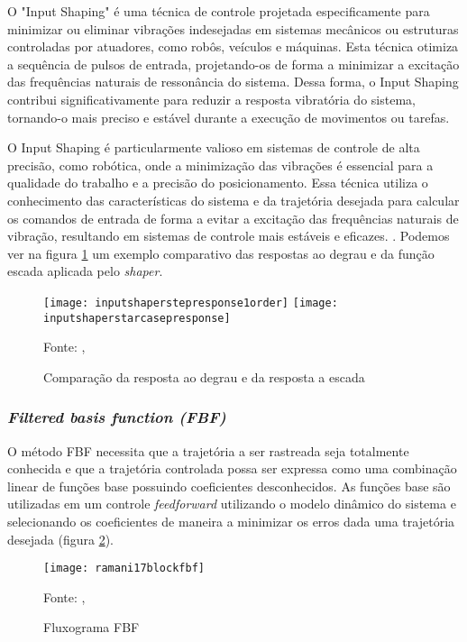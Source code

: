 O "Input Shaping" é uma técnica de controle projetada especificamente para minimizar ou eliminar vibrações indesejadas em sistemas mecânicos ou estruturas controladas por atuadores, como robôs, veículos e máquinas. Esta técnica otimiza a sequência de pulsos de entrada, projetando-os de forma a minimizar a excitação das frequências naturais de ressonância do sistema. Dessa forma, o Input Shaping contribui significativamente para reduzir a resposta vibratória do sistema, tornando-o mais preciso e estável durante a execução de movimentos ou tarefas.

O Input Shaping é particularmente valioso em sistemas de controle de alta precisão, como robótica, onde a minimização das vibrações é essencial para a qualidade do trabalho e a precisão do posicionamento. Essa técnica utiliza o conhecimento das características do sistema e da trajetória desejada para calcular os comandos de entrada de forma a evitar a excitação das frequências naturais de vibração, resultando em sistemas de controle mais estáveis e eficazes.
\cite{singhose97}.
Podemos
ver na figura \ref{fig:degr_vs_esc} um exemplo comparativo
das respostas ao degrau e da função escada aplicada pelo \textit{shaper}.

\begin{figure}[H]
    \centering
    \caption{Comparação da resposta ao degrau e da resposta a escada}
    \texttt{[image: inputshaperstepresponse1order]}
    \texttt{[image: inputshaperstarcasepresponse]}

    {\footnotesize Fonte: \citeauthor{singhose97}, \citeyear{singhose97}}
    \label{fig:degr_vs_esc}
\end{figure}

\subsubsection{\textit{Filtered basis function (FBF)}}
O método FBF necessita que a trajetória a ser rastreada seja totalmente
conhecida e que a trajetória controlada possa ser expressa como
uma combinação linear de funções base possuindo coeficientes desconhecidos.
As funções base são utilizadas em um controle \textit{feedforward} utilizando
o modelo dinâmico do sistema e selecionando os coeficientes de maneira a
minimizar os erros dada uma trajetória desejada (figura \ref{fig:flowchart_fbf}).
\cite{ramani17}

\begin{figure}[H]
    \centering
    \caption{Fluxograma FBF}
    \texttt{[image: ramani17blockfbf]}

    {\footnotesize Fonte: \citeauthor{ramani17}, \citeyear{ramani17}}
    \label{fig:flowchart_fbf}
\end{figure}


